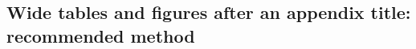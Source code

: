 \documentclass{aa}
\begin{document}
\begin{appendix}





\onecolumn
\section{Wide tables and figures after an appendix title: recommended method}


\end{appendix}
\end{document}
